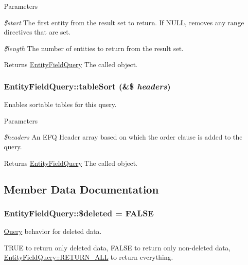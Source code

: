 \begin{DoxyParams}{Parameters}
\item[{\em \$start}]The first entity from the result set to return. If NULL, removes any range directives that are set. \item[{\em \$length}]The number of entities to return from the result set.\end{DoxyParams}
\begin{DoxyReturn}{Returns}
\hyperlink{classEntityFieldQuery}{EntityFieldQuery} The called object. 
\end{DoxyReturn}
\hypertarget{classEntityFieldQuery_a582ffe2a0a08dc4def3076af2bc6563a}{
\subsubsection[{tableSort}]{\setlength{\rightskip}{0pt plus 5cm}EntityFieldQuery::tableSort (\&\$ {\em headers})}}
\label{classEntityFieldQuery_a582ffe2a0a08dc4def3076af2bc6563a}
Enables sortable tables for this query.


\begin{DoxyParams}{Parameters}
\item[{\em \$headers}]An EFQ Header array based on which the order clause is added to the query.\end{DoxyParams}
\begin{DoxyReturn}{Returns}
\hyperlink{classEntityFieldQuery}{EntityFieldQuery} The called object. 
\end{DoxyReturn}


\subsection{Member Data Documentation}
\hypertarget{classEntityFieldQuery_a87e043391f89270b6d1902acf9184e14}{
\subsubsection[{\$deleted}]{\setlength{\rightskip}{0pt plus 5cm}EntityFieldQuery::\$deleted = FALSE}}
\label{classEntityFieldQuery_a87e043391f89270b6d1902acf9184e14}
\hyperlink{classQuery}{Query} behavior for deleted data.

TRUE to return only deleted data, FALSE to return only non-\/deleted data, \hyperlink{classEntityFieldQuery_a1d63c58e6b1d99e6034d96875305fe0d}{EntityFieldQuery::RETURN\_\-ALL} to return everything.

